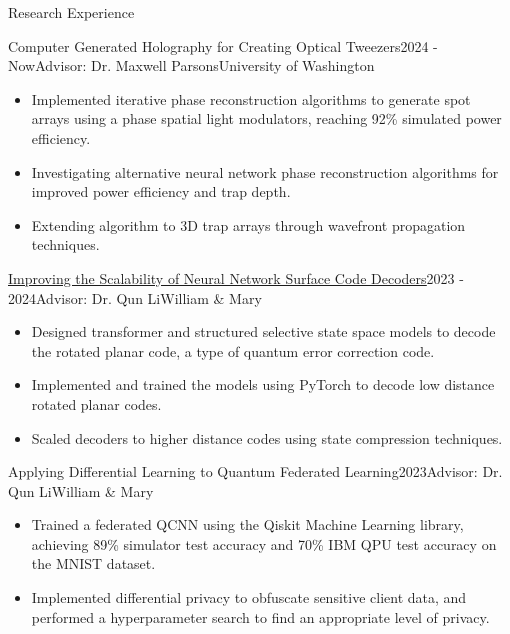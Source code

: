 \begin{rSection}{Research Experience}
\begin{rSubsection}{Computer Generated Holography for Creating Optical Tweezers}{2024 - Now}{Advisor: Dr. Maxwell Parsons}{\small University of Washington}
\begin{itemize}
\item Implemented iterative phase reconstruction algorithms to generate spot arrays using a phase spatial light modulators, reaching 92\% simulated power efficiency.
\item Investigating alternative neural network phase reconstruction algorithms for improved power efficiency and trap depth.
\item Extending algorithm to 3D trap arrays through wavefront propagation techniques.
\end{itemize}
\end{rSubsection}

\begin{rSubsection}{\underline{\href{https://scholarworks.wm.edu/honorstheses/2176/}{Improving the Scalability of Neural Network Surface Code Decoders}}}{2023 - 2024}{Advisor: Dr. Qun Li}{\small William \& Mary}
\begin{itemize}
\item Designed transformer and structured selective state space models to decode the rotated planar code, a type of quantum error correction code.
\item Implemented and trained the models using PyTorch to decode low distance rotated planar codes.
\item Scaled decoders to higher distance codes using state compression techniques.
\end{itemize}
\end{rSubsection}

\begin{rSubsection}{Applying Differential Learning to Quantum Federated Learning}{2023}{Advisor: Dr. Qun Li}{\small William \& Mary}
\begin{itemize}
\item Trained a federated QCNN using the Qiskit Machine Learning library, achieving 89\% simulator test accuracy and 70\% IBM QPU test accuracy on the MNIST dataset.
\item Implemented differential privacy to obfuscate sensitive client data, and performed a hyperparameter search to find an appropriate level of privacy. 
\end{itemize}
\end{rSubsection}


\end{rSection}
